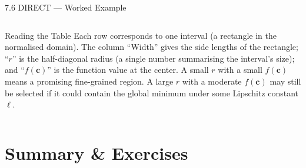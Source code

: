 \documentclass[aspectratio=169,10pt]{beamer}
\begin{document}
\begin{frame}[allowframebreaks]{7.6 DIRECT --- Worked Example}
\begin{columns}[T]
      \begin{block}{Reading the Table}
        Each row corresponds to one interval (a rectangle in the
        normalised domain).  The column ``Width'' gives the side lengths
        of the rectangle; ``$r$'' is the half-diagonal radius
        (a single number summarising the interval's size); and
        ``$f(\mathbf{c})$'' is the function value at the center.
        A small $r$ with a small $f(\mathbf{c})$ means a promising
        fine-grained region.  A large $r$ with a moderate $f(\mathbf{c})$
        may still be selected if it could contain the global minimum
        under some Lipschitz constant $\ell$.
      \end{block}
  \end{columns}
\end{frame}

\section{Summary \& Exercises}
\end{document}

